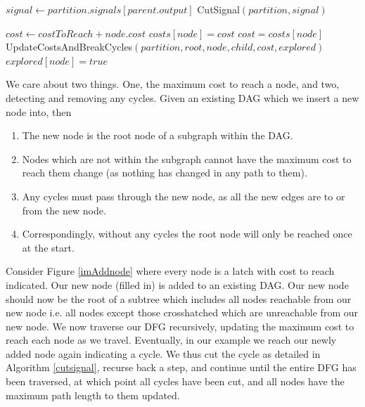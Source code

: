 \documentclass[12pt,final,oneside]{dwThesis} %
\begin{document}
\begin{algorithm}
      \begin{algorithmic}[1]
            
        \Return \EndIf {} 

         \State $signal \gets partition.signals[parent.output]$  
         \State CutSignal$(partition, signal)$

        \Return
        \EndIf 
         \State $cost \gets costToReach+node.cost$
         \State $costs[node] = cost$ \Else 
         \State
         $cost = costs[node]$ \EndIf {} 
         \State
         UpdateCostsAndBreakCycles$(partition, root, node, child, cost,
         explored)$ \EndFor 
         \State $explored[node] = true$ \EndProcedure

      \end{algorithmic}

   \end{algorithm}
   We care about two things. One, the
   maximum cost to reach a node, and two, detecting and removing any cycles.
   Given an existing \gls{DAG} which we insert a new node into, then

   \begin{enumerate}

      \item The new node is the root node of a subgraph within the \gls{DAG}.
      \item Nodes which are not within the subgraph cannot have the maximum
         cost to reach them change (as nothing has changed in any path to
         them).
      \item Any cycles must pass through the new node, as all the new edges are
         to or from the new node.
      \item Correspondingly, without any cycles the root node will only be
         reached once at the start.  
   \end{enumerate}
   Consider Figure
   \ref{imAddnode} where every node is a latch with cost to reach indicated.
   Our new node (filled in) is added to an existing \gls{DAG}. Our new node
   should now be the root of a subtree which includes all nodes reachable
   from our new node i.e. all nodes except those crosshatched which are
   unreachable from our new node.  We now traverse our \gls{DFG}
   recursively, updating the maximum cost to reach each node as we travel.
   Eventually, in our example we reach our newly added node again indicating
   a cycle. We thus cut the cycle as detailed in Algorithm
   \ref{cutsignal}, recurse back a step,
   and continue until the entire \gls{DFG} has been traversed, at which
   point all cycles have been cut, and all nodes have the maximum path
   length to them updated.
   
\end{document}
